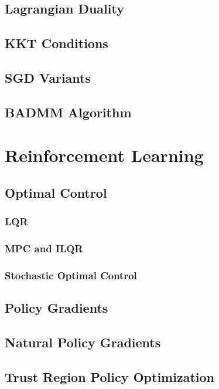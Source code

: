 \documentclass[12pt]{article}
\begin{document}
\subsection{Lagrangian Duality}

\subsection{KKT Conditions}

\subsection{SGD Variants}

\subsection{BADMM Algorithm}

\section{Reinforcement Learning}

\subsection{Optimal Control}

\subsubsection{LQR}

\subsubsection{MPC and ILQR}

\subsubsection{Stochastic Optimal Control}

\subsection{Policy Gradients}

\subsection{Natural Policy Gradients}

\subsection{Trust Region Policy Optimization}
\end{document}
